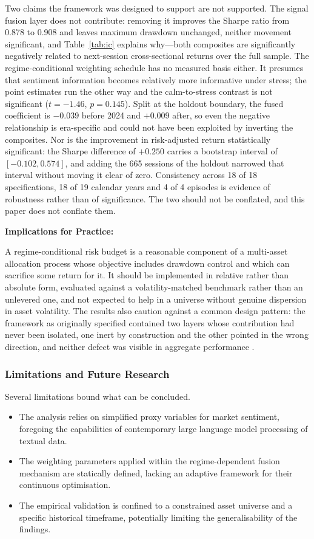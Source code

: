 \documentclass{singlecol-new}
\theoremstyle{TH}{
\newtheorem{lemma}{Lemma}
\newtheorem{theorem}[lemma]{Theorem}
\newtheorem{corrolary}[lemma]{Corrolary}
\newtheorem{conjecture}[lemma]{Conjecture}
\newtheorem{proposition}[lemma]{Proposition}
\newtheorem{claim}[lemma]{Claim}
\newtheorem{stheorem}[lemma]{Wrong Theorem}
\newtheorem{algorithm}{Algorithm}
}
\theoremstyle{THrm}{
\newtheorem{definition}{Definition}[section]
\newtheorem{question}{Question}[section]
\newtheorem{remark}{Remark}
\newtheorem{scheme}{Scheme}
}
\theoremstyle{THhit}{
\newtheorem{case}{Case}[section]
}
\begin{document}
Two claims the framework was designed to support are not supported. The signal fusion
layer does not contribute: removing it improves the Sharpe ratio from 0.878 to 0.908 and
leaves maximum drawdown unchanged, neither movement significant, and
Table~\ref{tab:ic} explains why---both composites are significantly negatively related to
next-session cross-sectional returns over the full sample. The regime-conditional
weighting schedule has no measured basis either. It presumes that sentiment information
becomes relatively more informative under stress; the point estimates run the other way
and the calm-to-stress contrast is not significant ($t = -1.46$, $p = 0.145$). Split at
the holdout boundary, the fused coefficient is $-0.039$ before 2024 and $+0.009$ after,
so even the negative relationship is era-specific and could not have been exploited by
inverting the composites. Nor is the improvement in risk-adjusted return statistically
significant: the Sharpe difference of $+0.250$ carries a bootstrap interval of
$[-0.102, 0.574]$, and adding the 665 sessions of the holdout narrowed that interval
without moving it clear of zero. Consistency across 18 of 18 specifications, 18 of 19
calendar years and 4 of 4 episodes is evidence of robustness rather than of significance.
The two should not be conflated, and this paper does not conflate them.

\textbf{Implications for Practice:}

A regime-conditional risk budget is a reasonable component of a multi-asset allocation
process whose objective includes drawdown control and which can sacrifice some return for
it. It should be implemented in relative rather than absolute form, evaluated against a
volatility-matched benchmark rather than an unlevered one, and not expected to help in a
universe without genuine dispersion in asset volatility. The results also caution against
a common design pattern: the framework as originally specified contained two layers whose
contribution had never been isolated, one inert by construction and the other pointed in
the wrong direction, and neither defect was visible in aggregate performance
\citep{prado16}.

\subsubsection{Limitations and Future Research}
\label{sec:future}

Several limitations bound what can be concluded.

\begin{itemize}
\item The analysis relies on simplified proxy variables for market sentiment, foregoing
the capabilities of contemporary large language model processing of textual data.
\item The weighting parameters applied within the regime-dependent fusion mechanism are
statically defined, lacking an adaptive framework for their continuous optimisation.
\item The empirical validation is confined to a constrained asset universe and a specific
historical timeframe, potentially limiting the generalisability of the findings.
\end{itemize}
\end{document}

